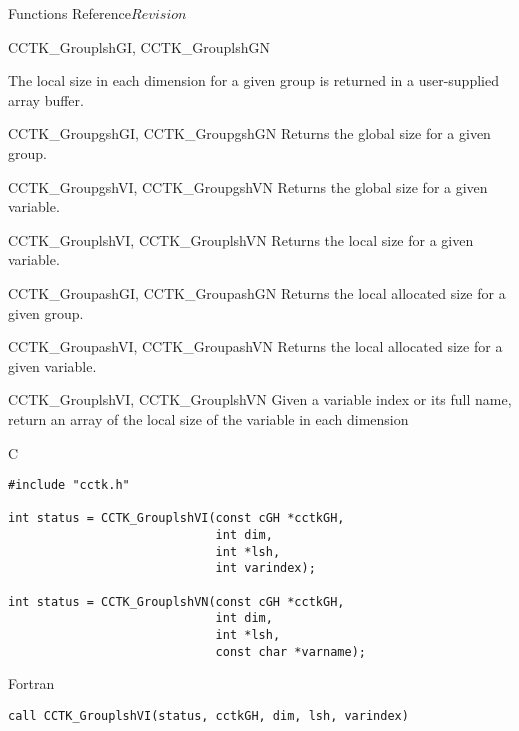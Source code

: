 \begin{cactuspart}{ Functions Reference}{}{$Revision$}
\begin{FunctionDescription}{CCTK\_GrouplshGI, CCTK\_GrouplshGN}
\begin{Discussion}
The local size in each dimension for a given group is returned in a user-supplied array buffer.
\end{Discussion}

\begin{SeeAlsoSection}
\begin{SeeAlso}{CCTK\_GroupgshGI, CCTK\_GroupgshGN}
Returns the global size for a given group.
\end{SeeAlso}
\begin{SeeAlso}{CCTK\_GroupgshVI, CCTK\_GroupgshVN}
Returns the global size for a given variable.
\end{SeeAlso}
\begin{SeeAlso}{CCTK\_GrouplshVI, CCTK\_GrouplshVN}
Returns the local size for a given variable.
\end{SeeAlso}
\begin{SeeAlso}{CCTK\_GroupashGI, CCTK\_GroupashGN}
Returns the local allocated size for a given group.
\end{SeeAlso}
\begin{SeeAlso}{CCTK\_GroupashVI, CCTK\_GroupashVN}
Returns the local allocated size for a given variable.
\end{SeeAlso}
\end{SeeAlsoSection}
\end{FunctionDescription}


\begin{FunctionDescription}{CCTK\_GrouplshVI, CCTK\_GrouplshVN}
\label{CCTK-GrouplshVI}
\label{CCTK-GrouplshVN}
Given a variable index or its full name, return an array of the local size of the variable in each dimension

\begin{SynopsisSection}
\begin{Synopsis}{C}
\begin{verbatim}
#include "cctk.h"

int status = CCTK_GrouplshVI(const cGH *cctkGH,
                             int dim,
                             int *lsh,
                             int varindex);

int status = CCTK_GrouplshVN(const cGH *cctkGH,
                             int dim,
                             int *lsh,
                             const char *varname);
\end{verbatim}
\end{Synopsis}
\begin{Synopsis}{Fortran}
\begin{verbatim}
call CCTK_GrouplshVI(status, cctkGH, dim, lsh, varindex)


\end{verbatim}
\end{Synopsis}
\end{SynopsisSection}
\end{FunctionDescription}
\end{cactuspart}
